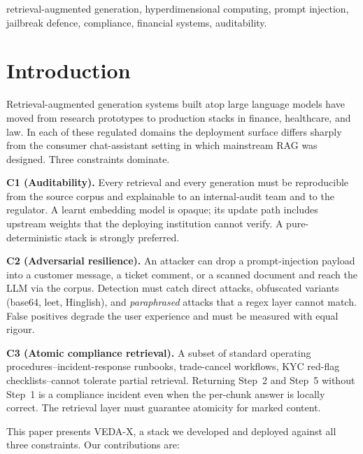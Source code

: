 \documentclass[conference]{IEEEtran}
\begin{document}
\begin{IEEEkeywords}
retrieval-augmented generation, hyperdimensional computing,
prompt injection, jailbreak defence, compliance, financial systems,
auditability.
\end{IEEEkeywords}

\section{Introduction}
Retrieval-augmented generation systems built atop large language
models have moved from research prototypes to production stacks in
finance, healthcare, and law.  In each of these regulated domains the
deployment surface differs sharply from the consumer chat-assistant
setting in which mainstream RAG was designed.  Three constraints
dominate.

\textbf{C1 (Auditability).}  Every retrieval and every generation
must be reproducible from the source corpus and explainable to an
internal-audit team and to the regulator.  A learnt embedding model
is opaque; its update path includes upstream weights that the
deploying institution cannot verify.  A pure-deterministic stack is
strongly preferred.

\textbf{C2 (Adversarial resilience).}  An attacker can drop a
prompt-injection payload into a customer message, a ticket comment,
or a scanned document and reach the LLM via the corpus.  Detection
must catch direct attacks, obfuscated variants (base64, leet,
Hinglish), and \emph{paraphrased} attacks that a regex layer cannot
match.  False positives degrade the user experience and must be
measured with equal rigour.

\textbf{C3 (Atomic compliance retrieval).}  A subset of standard
operating procedures--incident-response runbooks, trade-cancel
workflows, KYC red-flag checklists--cannot tolerate partial
retrieval.  Returning Step~2 and Step~5 without Step~1 is a
compliance incident even when the per-chunk answer is locally
correct.  The retrieval layer must guarantee atomicity for marked
content.

This paper presents \textsc{VEDA-X}, a stack we developed and
deployed against all three constraints.  Our contributions are:
\end{document}
